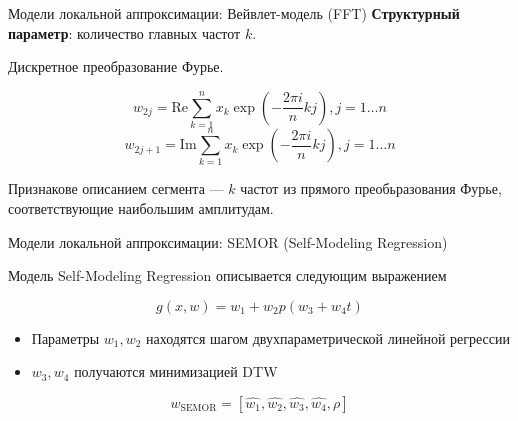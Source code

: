 \documentclass{beamer}
\begin{document}

\begin{frame}{Модели локальной аппроксимации: Вейвлет-модель (FFT)}
    \textbf{Структурный параметр}: количество главных частот $k$.

Дискретное преобразование Фурье.

$$
    w_{2j} = \mathrm{Re} \sum_{k=1}^{n} x_k \exp(-\frac{2\pi i}{n}kj), j=1\ldots n
$$
$$
    w_{2j + 1} = \mathrm{Im} \sum_{k=1}^{n} x_k \exp(-\frac{2\pi i}{n}kj), j=1\ldots n
$$

Признакове описанием сегмента — $k$ частот из прямого преобьразования Фурье,
соответствующие наибольшим амплитудам.

\end{frame}

\begin{frame}{Модели локальной аппроксимации: SEMOR (Self-Modeling Regression)}

Модель Self-Modeling Regression описывается следующим выражением

$$
g(x, w) = w_1 + w_2 p(w_3 + w_4t)
$$

\begin{itemize}
    \item Параметры $w_1, w_2$ находятся шагом двухпараметрической
линейной регрессии
    \item $w_3, w_4$ получаются минимизацией DTW
\end{itemize}

$$
w_{\text{SEMOR}} = [\hat{w_1}, \hat{w_2}, \hat{w_3}, \hat{w_4}, \rho]
$$

\end{frame}

\end{document}
